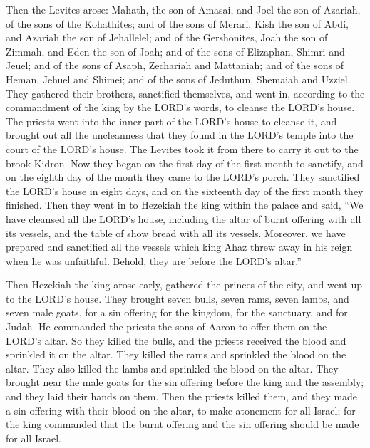  Then the Levites arose: Mahath, the son of Amasai, and
Joel the son of Azariah, of the sons of the Kohathites; and of the sons
of Merari, Kish the son of Abdi, and Azariah the son of Jehallelel; and
of the Gershonites, Joah the son of Zimmah, and Eden the son of Joah;
 and of the sons of Elizaphan, Shimri and Jeuel; and of the
sons of Asaph, Zechariah and Mattaniah;  and of the sons of
Heman, Jehuel and Shimei; and of the sons of Jeduthun, Shemaiah and
Uzziel.  They gathered their brothers, sanctified
themselves, and went in, according to the commandment of the king by the
LORD's words, to cleanse the LORD's house.  The priests
went into the inner part of the LORD's house to cleanse it, and brought
out all the uncleanness that they found in the LORD's temple into the
court of the LORD's house. The Levites took it from there to carry it
out to the brook Kidron.  Now they began on the first day
of the first month to sanctify, and on the eighth day of the month they
came to the LORD's porch. They sanctified the LORD's house in eight
days, and on the sixteenth day of the first month they finished.
 Then they went in to Hezekiah the king within the palace
and said, ``We have cleansed all the LORD's house, including the altar
of burnt offering with all its vessels, and the table of show bread with
all its vessels.  Moreover, we have prepared and sanctified
all the vessels which king Ahaz threw away in his reign when he was
unfaithful. Behold, they are before the LORD's altar.''

 Then Hezekiah the king arose early, gathered the princes
of the city, and went up to the LORD's house.  They brought
seven bulls, seven rams, seven lambs, and seven male goats, for a sin
offering for the kingdom, for the sanctuary, and for Judah. He commanded
the priests the sons of Aaron to offer them on the LORD's altar.
 So they killed the bulls, and the priests received the
blood and sprinkled it on the altar. They killed the rams and sprinkled
the blood on the altar. They also killed the lambs and sprinkled the
blood on the altar.  They brought near the male goats for
the sin offering before the king and the assembly; and they laid their
hands on them.  Then the priests killed them, and they made
a sin offering with their blood on the altar, to make atonement for all
Israel; for the king commanded that the burnt offering and the sin
offering should be made for all Israel.

